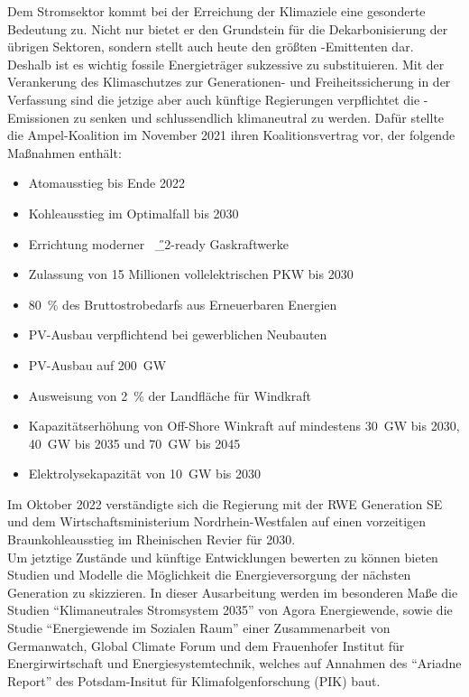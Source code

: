 	Dem Stromsektor kommt bei der Erreichung der Klimaziele eine gesonderte Bedeutung zu. Nicht nur bietet er den Grundstein für die Dekarbonisierung der übrigen Sektoren, sondern stellt auch heute den größten \SI{}{\COtwo}-Emittenten dar. Deshalb ist es wichtig fossile Energieträger sukzessive zu substituieren. Mit der Verankerung des Klimaschutzes zur Generationen- und Freiheitssicherung in der Verfassung sind die jetzige aber auch künftige Regierungen verpflichtet die \SI{}{\COtwo}-Emissionen zu senken und schlussendlich klimaneutral zu werden. Dafür stellte die Ampel-Koalition im November 2021 ihren Koalitionsvertrag vor, der folgende Maßnahmen enthält:
		\begin{itemize}
			\item Atomausstieg bis Ende 2022
			\item Kohleausstieg im Optimalfall bis 2030
			\item Errichtung moderner \SI{}{\H{_2}}-ready Gaskraftwerke
			\item Zulassung von 15 Millionen vollelektrischen PKW bis 2030
			\item \SI{80}{\percent} des Bruttostrobedarfs aus Erneuerbaren Energien
			\item PV-Ausbau verpflichtend bei gewerblichen Neubauten
			\item PV-Ausbau auf \SI{200}{\giga \watt}
			\item Ausweisung von \SI{2}{\percent} der Landfläche für Windkraft
			\item Kapazitätserhöhung von Off-Shore Winkraft auf mindestens \SI{30}{\giga \watt} bis 2030, \SI{40}{\giga \watt} bis 2035 und \SI{70}{\giga \watt} bis 2045
			\item Elektrolysekapazität von \SI{10}{\giga \watt} bis 2030
		\end{itemize}
		Im Oktober 2022 verständigte sich die Regierung mit der RWE Generation SE und dem Wirtschaftsministerium Nordrhein-Westfalen auf einen vorzeitigen Braunkohleausstieg im Rheinischen Revier für 2030.\\
		
		Um jetztige Zustände und künftige Entwicklungen bewerten zu können bieten Studien und Modelle die Möglichkeit die Energieversorgung der nächsten Generation zu skizzieren. In dieser Ausarbeitung werden im besonderen Maße die Studien "`Klimaneutrales Stromsystem 2035"' von Agora Energiewende, sowie die Studie "`Energiewende im Sozialen Raum"' einer Zusammenarbeit von Germanwatch, Global Climate Forum und dem Frauenhofer Institut für Energirwirtschaft und Energiesystemtechnik, welches auf Annahmen des "`Ariadne Report"' des Potsdam-Insitut für Klimafolgenforschung (PIK) baut.\\

